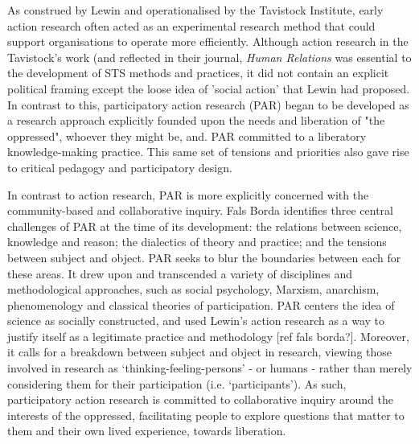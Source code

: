 As construed by Lewin and operationalised by the Tavistock Institute, early action research often acted as an experimental research method that could support organisations to operate more efficiently\cite{neumann_kurt_2005}. Although action research in the Tavistock's work (and reflected in their journal, \textit{Human Relations} was essential to the development of STS methods and practices, it did not contain an explicit political framing except the loose idea of 'social action' that Lewin had proposed. In contrast to this, participatory action research (PAR) began to be developed as a research approach explicitly founded upon the needs and liberation of "the oppressed", whoever they might be, and. PAR committed to a liberatory knowledge-making practice\cite{reason_handbook_2006}. This same set of tensions and priorities also gave rise to critical pedagogy and participatory design.

In contrast to action research, PAR is more explicitly concerned with the community-based and collaborative inquiry. Fals Borda \cite{Fals Borda 2001} identifies three central challenges of PAR at the time of its development: the relations between science, knowledge and reason; the dialectics of theory and practice; and the tensions between subject and object. PAR seeks to blur the boundaries between each for these areas.   It drew upon and transcended a variety of disciplines and methodological approaches, such as social psychology, Marxism, anarchism, phenomenology and classical theories of participation. PAR centers the idea of science as socially constructed, and used Lewin’s action research as a way to justify itself as a legitimate practice and methodology [ref fals borda?]. Moreover, it calls for a breakdown between subject and object in research, viewing those involved in research as ‘thinking-feeling-persons’ - or humans - rather than merely considering them for their participation (i.e. ‘participants’). As such, participatory action research is committed to collaborative inquiry around the interests of the oppressed, facilitating people to explore questions that matter to them and their own lived experience, towards liberation. 	

